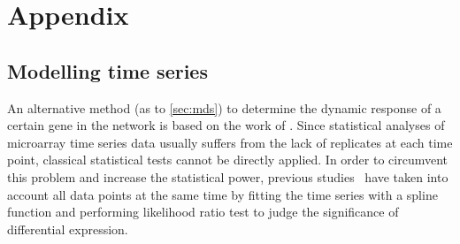 \chapter{Appendix}

\section{Modelling time series}
An alternative method (as to \ref{sec:mds}) to determine 
the dynamic response of a certain
gene in the network is based on the work of \cite{Mar2009}. 
Since statistical analyses of microarray time series data usually 
suffers from the lack
of replicates at each time point, classical statistical tests 
cannot be directly applied. In order to 
circumvent this problem and increase the statistical power,
previous studies~\citep{Bar-Joseph2003,Storey2005} have taken into 
account all data points at the
same time by fitting the time series with a spline function and 
performing likelihood ratio test to judge the significance of 
differential expression.


